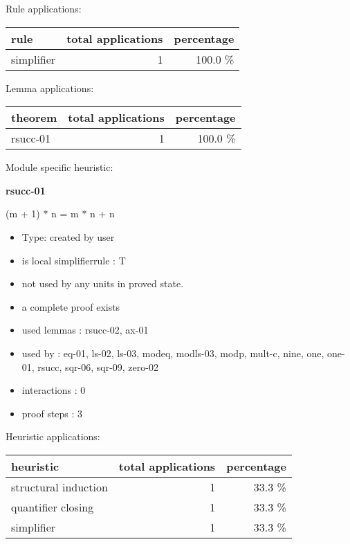 \documentclass[a4paper]{article}
\begin{document}
Rule applications:

\begin{supertabular}{l|r|r}
rule	        & total applications & percentage \\ \hline
simplifier & 1 & 100.0 \% \\

\end{supertabular}

Lemma applications:

\begin{supertabular}{l|r|r}
theorem	        & total applications & percentage \\ \hline
rsucc-01 & 1 & 100.0 \% \\

\end{supertabular}

Module specific heuristic:

\pagebreak

{\LARGE\bf rsucc-01}\label{lemma-rsucc-01}

\medskip

 \Fol (m + 1) $*$ n = m $*$ n + n

\begin{itemize}

\item Type: created by user

\item is local simplifierrule : T
\item not used by any units in proved state.
\item       a complete proof exists
\item       used lemmas  : rsucc-02, ax-01
\item       used by      : eq-01, ls-02, ls-03, modeq, modls-03, modp, mult-c, nine, one, one-01, rsucc, sqr-06, sqr-09, zero-02
\item       interactions : 0
\item       proof steps  : 3
\end{itemize}

\medskip


Heuristic applications:

\begin{supertabular}{l|r|r}
heuristic	& total applications & percentage \\ \hline
structural induction & 1 & 33.3 \% \\
quantifier closing & 1 & 33.3 \% \\
simplifier & 1 & 33.3 \% \\

\end{supertabular}
\end{document}

